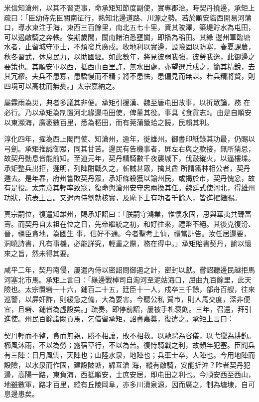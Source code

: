 \begin{pinyinscope}
 米信知滄州，以其不習吏事，命承矩知節度副使，實專郡治。時契丹撓邊，承矩上疏曰：「臣幼侍先臣關南征行，熟知北邊道路、川源之勢。若於順安砦西開易河蒲口，導水東注于海，東西三百餘里，南北五七十里，資其陂澤，築堤貯水為屯田，可以遏敵騎之奔軼。俟期歲間，關南諸泊悉壅闐，即播為稻田。其緣
 邊州軍臨塘水者，止留城守軍士，不煩發兵廣戍。收地利以實邊，設險固以防塞，春夏課農，秋冬習武，休息民力，以助國經。如此數年，將見彼弱我強，彼勞我逸，此御邊之要策也。其順安軍以西，抵西山百里許，無水田處，亦望選兵戍之，簡其精銳，去其冗繆。夫兵不患寡，患驕慢而不精；將不患怯，患偏見而無謀。若兵精將賢，則四境可以高枕而無憂。」太宗嘉納之。



 屬霖雨為災，典者多議其非便。承矩引援漢、魏至唐屯田故事，以折眾論，務
 在必行。乃以承矩為制置河北緣邊屯田使，俾董其役。事具《食貨志》。由是自順安以東瀕海，廣袤數百里，悉為稻田，而有莞蒲蜃蛤之饒，民賴其利。



 淳化四年，擢為西上閣門使、知滄州，逾年，徙雄州。御書印紙錄其功最，仍賜以弓劍。承矩推誠御眾，同其甘苦。邊民有告機事者，屏左右與之款接，無所猜忌，故契丹動息皆能前知。至道元年，契丹精騎數千夜襲城下，伐鼓縱火，以逼樓堞。承矩整兵出拒，遲明，列陣酣戰久之，斬馘甚眾，擒其酋
 所謂鐵林相公者，契丹遁去。是年春，府州嘗敗契丹眾，承矩條殺獲以諭州民，或揭於市，契丹愧忿，故有是役。太宗意其輕率致寇，復命與滄州安守忠兩換其任。魏廷式使河北，得雄州功狀，抗表上言。又遣內侍劉勍核實，及麾下士有功者千餘人，皆進擢繼賜。



 真宗嗣位，復遣知雄州，賜承矩詔曰：「朕嗣守鴻業，惟懷永固，思與華夷共臻富壽。而契丹自太祖在位之日，先帝繼統之初，和好往來，禮幣不絕。其後克復汾、晉，疆臣貪地，為國生
 事，信好不通。今者聖考上仙，禮當訃告。汝任居邊要，洞曉詩書，凡有事機，必能詳究，輕重之際，務在得中。」承矩貽書契丹，諭以懷來之旨，然未得其要。



 咸平二年，契丹南侵，屢遣內侍以密詔問御遏之計，密封以獻。嘗詔聽邊民越拒馬河塞北市馬。承矩上言曰：「緣邊戰棹司自淘河至泥姑海口，屈曲九百餘里，此天險也。太宗置砦一十六，鋪百二十五，廷臣十一人，戍卒三千餘，部舟百艘，往來巡警，以屏奸詐，則緩急之備，大為要害。今聽公私
 貿市，則人馬交度，深非便宜，且砦、鋪皆為虛設矣。」疏奏，即停前詔，屢被手札褒飭。三年，召還，拜引進使。州民百餘詣闕貢馬，乞借留承矩，詔書嘉獎，復遣之。承矩上言曰：



 契丹輕而不整，貪而無親，勝不相讓，敗不相救。以馳騁為容儀，以弋獵為耕釣。櫛風沐雨，不以為勞；露宿草行，不以為苦。復恃騎戰之利，故頻年犯塞。臣聞兵有三陣：日月風雲，天陣也；山陸水泉，地陣也；兵車士卒，人陣也。今用地陣而設險，以水泉而作固，建設陂塘，綿亙滄
 海，縱有敵騎，安能折沖？昨者契丹犯邊，高陽一路，東負海，西抵順安，士庶安居，即屯田之利也。今順安西至西山，地雖數軍，路才百里，縱有丘陵岡阜，亦多川瀆泉源，因而廣之，制為塘埭，自可息邊患矣。




\end{pinyinscope}
